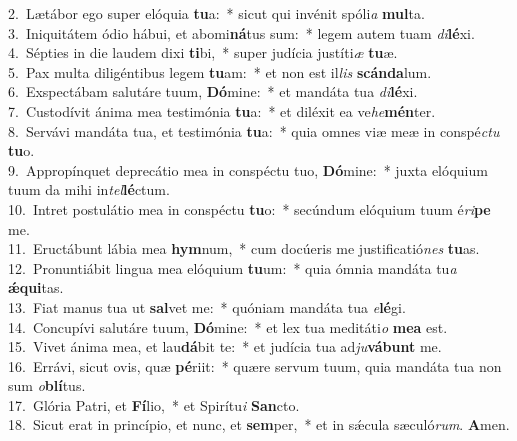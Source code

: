 {2.~}Lætábor ego super elóquia \textbf{tu}a:~* sicut qui invénit spóli\textit{a} \textbf{mul}ta.\\
{3.~}Iniquitátem ódio hábui, et abomi\textbf{ná}tus sum:~* legem autem tuam \textit{di}\textbf{lé}xi.\\
{4.~}Sépties in die laudem dixi \textbf{ti}bi,~* super judícia justíti\textit{æ} \textbf{tu}æ.\\
{5.~}Pax multa diligéntibus legem \textbf{tu}am:~* et non est il\textit{lis} \textbf{scán}\textbf{da}lum.\\
{6.~}Exspectábam salutáre tuum, \textbf{Dó}mine:~* et mandáta tua \textit{di}\textbf{lé}xi.\\
{7.~}Custodívit ánima mea testimónia \textbf{tu}a:~* et diléxit ea ve\textit{he}\textbf{mén}ter.\\
{8.~}Servávi mandáta tua, et testimónia \textbf{tu}a:~* quia omnes viæ meæ in conspé\textit{ctu} \textbf{tu}o.\\
{9.~}Appropínquet deprecátio mea in conspéctu tuo, \textbf{Dó}mine:~* juxta elóquium tuum da mihi in\textit{tel}\textbf{lé}ctum.\\
{10.~}Intret postulátio mea in conspéctu \textbf{tu}o:~* secúndum elóquium tuum é\textit{ri}\textbf{pe} me.\\
{11.~}Eructábunt lábia mea \textbf{hym}num,~* cum docúeris me justificatió\textit{nes} \textbf{tu}as.\\
{12.~}Pronuntiábit lingua mea elóquium \textbf{tu}um:~* quia ómnia mandáta tu\textit{a} \textbf{ǽ}\textbf{qui}tas.\\
{13.~}Fiat manus tua ut \textbf{sal}vet me:~* quóniam mandáta tua \textit{e}\textbf{lé}gi.\\
{14.~}Concupívi salutáre tuum, \textbf{Dó}mine:~* et lex tua meditáti\textit{o} \textbf{me}\textbf{a} est.\\
{15.~}Vivet ánima mea, et lau\textbf{dá}bit te:~* et judícia tua ad\textit{ju}\textbf{vá}\textbf{bunt} me.\\
{16.~}Errávi, sicut ovis, quæ \textbf{pé}riit:~* quære servum tuum, quia mandáta tua non sum \textit{o}\textbf{blí}tus.\\
{17.~}Glória Patri, et \textbf{Fí}lio,~* et Spirítu\textit{i} \textbf{San}cto.\\
{18.~}Sicut erat in princípio, et nunc, et \textbf{sem}per,~* et in sǽcula sæculó\textit{rum}. \textbf{A}men.\\
